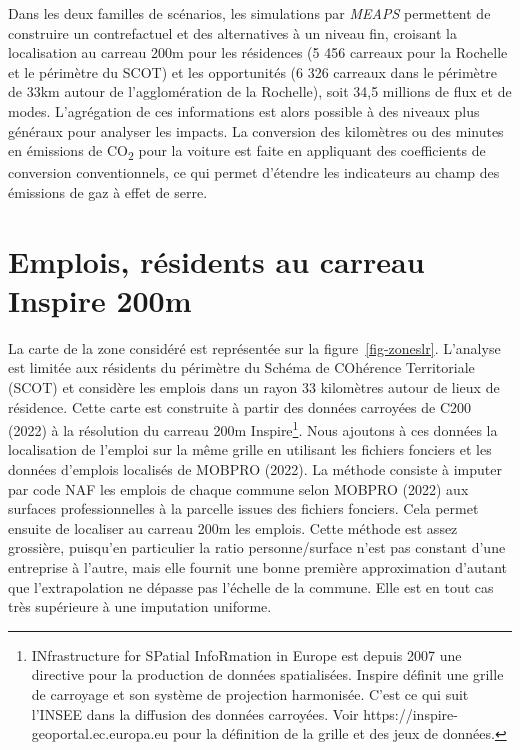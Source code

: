 \documentclass[
  10pt,
  a4paper,
  numbers=noendperiod,
  DIV=9]{scrreprt}
\begin{document}
Dans les deux familles de scénarios, les simulations par \emph{MEAPS}
permettent de construire un contrefactuel et des alternatives à un
niveau fin, croisant la localisation au carreau 200m pour les résidences
(5 456 carreaux pour la Rochelle et le périmètre du SCOT) et les
opportunités (6 326 carreaux dans le périmètre de 33km autour de
l'agglomération de la Rochelle), soit 34,5 millions de flux et de modes.
L'agrégation de ces informations est alors possible à des niveaux plus
généraux pour analyser les impacts. La conversion des kilomètres ou des
minutes en émissions de CO\textsubscript{2} pour la voiture est faite en
appliquant des coefficients de conversion conventionnels, ce qui permet
d'étendre les indicateurs au champ des émissions de gaz à effet de
serre.

\hypertarget{emplois-ruxe9sidents-au-carreau-inspire-200m}{%
\section{Emplois, résidents au carreau Inspire
200m}\label{emplois-ruxe9sidents-au-carreau-inspire-200m}}

La carte de la zone considéré est représentée sur la
figure~\ref{fig-zoneslr}. L'analyse est limitée aux résidents du
périmètre du Schéma de COhérence Territoriale (SCOT) et considère les
emplois dans un rayon 33 kilomètres autour de lieux de résidence. Cette
carte est construite à partir des données carroyées de C200 (2022) à la
résolution du carreau 200m Inspire\footnote{INfrastructure for SPatial
  InfoRmation in Europe est depuis 2007 une directive pour la production
  de données spatialisées. Inspire définit une grille de carroyage et
  son système de projection harmonisée. C'est ce qui suit l'INSEE dans
  la diffusion des données carroyées. Voir
  https://inspire-geoportal.ec.europa.eu pour la définition de la grille
  et des jeux de données.}. Nous ajoutons à ces données la localisation
de l'emploi sur la même grille en utilisant les fichiers fonciers et les
données d'emplois localisés de MOBPRO (2022). La méthode consiste à
imputer par code NAF les emplois de chaque commune selon MOBPRO (2022)
aux surfaces professionnelles à la parcelle issues des fichiers
fonciers. Cela permet ensuite de localiser au carreau 200m les emplois.
Cette méthode est assez grossière, puisqu'en particulier la ratio
personne/surface n'est pas constant d'une entreprise à l'autre, mais
elle fournit une bonne première approximation d'autant que
l'extrapolation ne dépasse pas l'échelle de la commune. Elle est en tout
cas très supérieure à une imputation uniforme.
\end{document}
